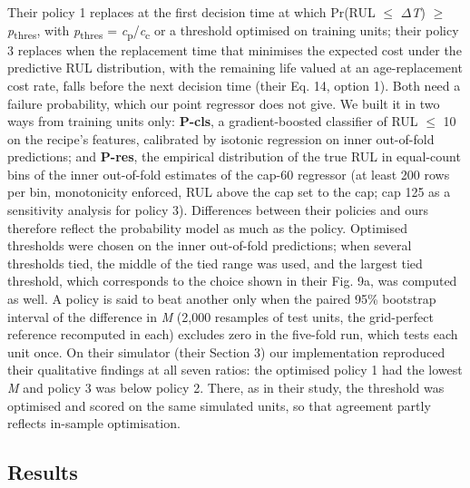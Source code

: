 \documentclass[a4paper,fleqn,doubleblind]{cas-dc}
\begin{document}
Their policy 1 replaces at the first decision time at which Pr(RUL $\le$ $\Delta$\textit{T}) $\ge$ \textit{p}\textsubscript{thres}, with \textit{p}\textsubscript{thres} = \textit{c}\textsubscript{p}/\textit{c}\textsubscript{c} or a threshold optimised on training units; their policy 3 replaces when the replacement time that minimises the expected cost under the predictive RUL distribution, with the remaining life valued at an age-replacement cost rate, falls before the next decision time (their Eq. 14, option 1). Both need a failure probability, which our point regressor does not give. We built it in two ways from training units only: \textbf{P-cls}, a gradient-boosted classifier of RUL $\le$ 10 on the recipe's features, calibrated by isotonic regression on inner out-of-fold predictions; and \textbf{P-res}, the empirical distribution of the true RUL in equal-count bins of the inner out-of-fold estimates of the cap-60 regressor (at least 200 rows per bin, monotonicity enforced, RUL above the cap set to the cap; cap 125 as a sensitivity analysis for policy 3). Differences between their policies and ours therefore reflect the probability model as much as the policy. Optimised thresholds were chosen on the inner out-of-fold predictions; when several thresholds tied, the middle of the tied range was used, and the largest tied threshold, which corresponds to the choice shown in their Fig. 9a, was computed as well. A policy is said to beat another only when the paired 95\% bootstrap interval of the difference in \textit{M} (2,000 resamples of test units, the grid-perfect reference recomputed in each) excludes zero in the five-fold run, which tests each unit once. On their simulator (their Section 3) our implementation reproduced their qualitative findings at all seven ratios: the optimised policy 1 had the lowest \textit{M} and policy 3 was below policy 2. There, as in their study, the threshold was optimised and scored on the same simulated units, so that agreement partly reflects in-sample optimisation.

\subsection{Results}
\end{document}
